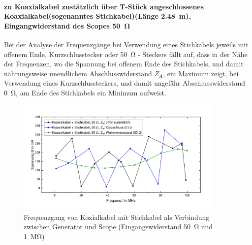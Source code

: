 \documentclass[a4paper,twoside,final]{article}
\begin{document}
\paragraph{zu Koaxialkabel zustätzlich über T-Stück angeschlossenes Koaxialkabel(sogenanntes Stichkabel)(Länge \SI{2,48}{\meter}), Eingangwiderstand des Scopes \SI{50}{\ohm}}

Bei der Analyse der Frequenzgänge bei Verwendung eines Stichkabels jeweils mit offenem Ende, Kurzschlusstecker oder \SI{50}{\ohm} - Steckers fällt auf, dass in der Nähe der Frequenzen, wo die Spannung bei offenem Ende des Stichkabels, und damit nährungsweise unendlichem Abschlusswiderstand $Z_A$, ein Maximum zeigt, bei Verwendung eines Kurzschlussteckers, und damit ungefähr Abschlusswiderstand \SI{0}{\ohm}, am Ende des Stichkabels ein Minimum aufweist. \\


\begin{figure}[htp]
    \centering
        \includegraphics[width=0.9\textwidth]{Bilder/Koaxialkabel_Stichkabel.pdf}
    \caption{Frequenzgang von Koxialkabel mit Stichkabel als Verbindung zwischen Generator und Scope (Eingangswiderstand \SI{50}{\ohm} und \SI{1}{\mega\ohm}) }
\end{figure}

\FloatBarrier
\end{document}
